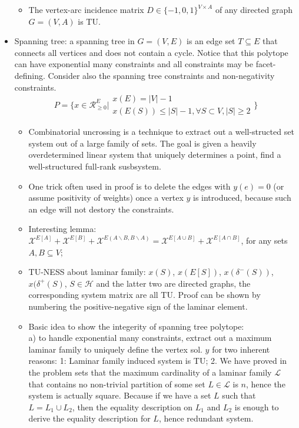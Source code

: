 \documentclass{article}
\begin{document}
\begin{itemize}
\begin{itemize}
\item The vertex-arc incidence matrix $D\in\{-1,0,1\}^{V\times A}$ of any directed graph $G=(V,A)$ is TU.
\end{itemize}
\item Spanning tree: a spanning tree in $G=(V,E)$ is an edge set $T\subseteq E$ that connects all vertices and does not contain a cycle. Notice that this polytope can have exponential many constraints and all constraints may be facet-defining. Consider also the spanning tree constraints and non-negativity constraints.
\begin{equation*}
P=\Bigg\{x\in\mathcal{R}_{\geq 0}^E\Big|
\begin{array}{lr}
x(E)=|V|-1\\
x(E(S))\leq |S|-1, \forall S\subset V, |S|\geq 2
\end{array}\Bigg\}
\end{equation*}
\begin{itemize}
\item Combinatorial uncrossing is a technique to extract out a well-structed set system out of a large family of sets. The goal is given a heavily overdetermined linear system that uniquely determines a point, find a well-structured full-rank susbsystem.
\item One trick often used in proof is to delete the edges with $y(e)=0$ (or assume positivity of weights) once a vertex $y$ is introduced, because such an edge will not destory the constraints.
\item Interesting lemma: $\mathcal{X}^{E[A]}+\mathcal{X}^{E[B]}+\mathcal{X}^{E(A\backslash B,B\backslash A)}=\mathcal{X}^{E[A\cup B]}+\mathcal{X}^{E[A\cap B]}$, for any sets $A,B\subseteq V$;
\item TU-NESS about laminar family: $x(S)$, $x(E[S])$, $x(\delta^-(S))$, $x(\delta^+(S)$, $S\in \mathcal{H}$ and the latter two are directed graphs, the corresponding system matrix are all TU. Proof can be shown by numbering the positive-negative sign of the laminar element.
\item Basic idea to show the integerity of spanning tree polytope: \\
a) to handle exponential many constraints, extract out a maximum laminar family to uniquely define the vertex sol. $y$ for two inherent reasons: 1: Laminar family induced system is TU; 2. We have proved in the problem sets that the maximum cardinality of a laminar family $\mathcal{L}$ that contains no non-trivial partition of some set $L\in\mathcal{L}$ is $n$, hence the system is actually square. Because if we have a set $L$ such that $L=L_1\cup L_2$, then the equality description on $L_1$ and $L_2$ is enough to derive the equality description for $L$, hence redundant system.\\

\end{itemize}
\end{itemize}
\end{document}
